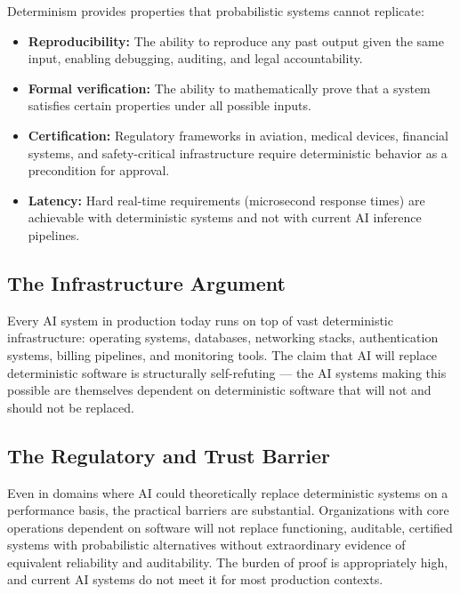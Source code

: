 \documentclass[12pt]{article}
\begin{document}
Determinism provides properties that probabilistic systems cannot replicate:

\begin{itemize}[noitemsep]
    \item \textbf{Reproducibility:} The ability to reproduce any past output given the same input, enabling debugging, auditing, and legal accountability.
    \item \textbf{Formal verification:} The ability to mathematically prove that a system satisfies certain properties under all possible inputs.
    \item \textbf{Certification:} Regulatory frameworks in aviation, medical devices, financial systems, and safety-critical infrastructure require deterministic behavior as a precondition for approval.
    \item \textbf{Latency:} Hard real-time requirements (microsecond response times) are achievable with deterministic systems and not with current AI inference pipelines.
\end{itemize}

\subsection{The Infrastructure Argument}

Every AI system in production today runs on top of vast deterministic infrastructure: operating systems, databases, networking stacks, authentication systems, billing pipelines, and monitoring tools. The claim that AI will replace deterministic software is structurally self-refuting --- the AI systems making this possible are themselves dependent on deterministic software that will not and should not be replaced.

\subsection{The Regulatory and Trust Barrier}

Even in domains where AI could theoretically replace deterministic systems on a performance basis, the practical barriers are substantial. Organizations with core operations dependent on software will not replace functioning, auditable, certified systems with probabilistic alternatives without extraordinary evidence of equivalent reliability and auditability. The burden of proof is appropriately high, and current AI systems do not meet it for most production contexts.

\end{document}
